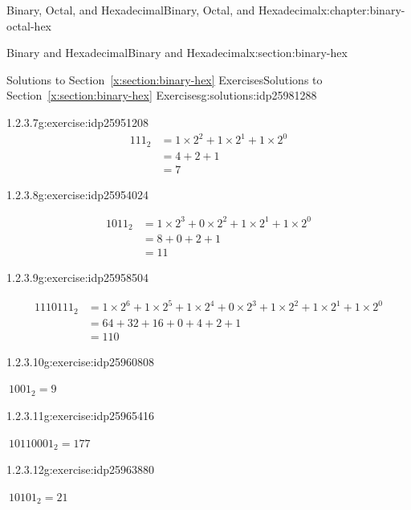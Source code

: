 \documentclass[twoside,10pt,]{book}
\newcommand{\xreffont}{\relax}
\numberwithin{equation}{section}
\newcommand{\amp}{&}
\begin{document}
\begin{chapterptx}{Binary, Octal, and Hexadecimal}{}{Binary, Octal, and Hexadecimal}{}{}{x:chapter:binary-octal-hex}
\begin{sectionptx}{Binary and Hexadecimal}{}{Binary and Hexadecimal}{}{}{x:section:binary-hex}
\begin{solutions-subsection}{Solutions to Section~{\xreffont\ref*{x:section:binary-hex}} Exercises}{}{Solutions to Section~{\xreffont\ref*{x:section:binary-hex}} Exercises}{}{}{g:solutions:idp25981288}
\begin{exercisegroup}
\begin{divisionsolutioneg}{1.2.3.7}{}{g:exercise:idp25951208}
\begin{align*}
111_2 \amp = 1\times2^2+1\times2^1+1\times2^0\\
\amp = 4+2+1\\
\amp = 7
\end{align*}
\end{divisionsolutioneg}%
\begin{divisionsolutioneg}{1.2.3.8}{}{g:exercise:idp25954024}%
\par\smallskip%
\noindent\hypertarget{g:solution:idp25956968-main}{}%
\begin{align*}
1011_2 \amp = 1\times2^3+0\times2^2+1\times2^1+1\times2^0\\
\amp = 8+0+2+1\\
\amp = 11
\end{align*}
\end{divisionsolutioneg}%
\begin{divisionsolutioneg}{1.2.3.9}{}{g:exercise:idp25958504}%
\par\smallskip%
\noindent\hypertarget{g:solution:idp25950952-main}{}%
\begin{align*}
1110111_2 \amp = 1\times2^6+1\times2^5+1\times2^4+0\times2^3+1\times2^2+1\times2^1+1\times2^0\\
\amp = 64+32+16+0+4+2+1\\
\amp = 110
\end{align*}
\end{divisionsolutioneg}%
\end{exercisegroup}
\par\medskip\noindent
\begin{exercisegroup}
\begin{divisionsolutioneg}{1.2.3.10}{}{g:exercise:idp25960808}%
\par\smallskip%
\noindent\hypertarget{g:solution:idp25965288-main}{}\(\ 1001_2=9\)\end{divisionsolutioneg}%
\begin{divisionsolutioneg}{1.2.3.11}{}{g:exercise:idp25965416}%
\par\smallskip%
\noindent\hypertarget{g:solution:idp25961960-main}{}\(\ 10110001_2=177\)\end{divisionsolutioneg}%
\begin{divisionsolutioneg}{1.2.3.12}{}{g:exercise:idp25963880}%
\par\smallskip%
\noindent\hypertarget{g:solution:idp25960040-main}{}\(\ 10101_2=21\)\end{divisionsolutioneg}%
\end{exercisegroup}

\end{solutions-subsection}
\end{sectionptx}
\end{chapterptx}
\end{document}
